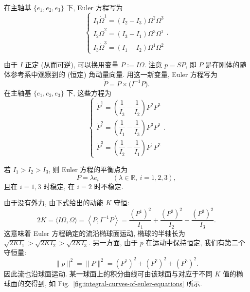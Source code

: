 在主轴基 $\{e_1,e_2,e_3\}$ 下, Euler 方程写为
\[
  \begin{cases}
    I_1\dot\Omega^1=(I_2-I_3)\Omega^2\Omega^3\\
    I_2\dot\Omega^2=(I_3-I_1)\Omega^3\Omega^1\\
    I_3\dot\Omega^3=(I_1-I_2)\Omega^1\Omega^2
  \end{cases}.
\]

由于 $I$ 正定 (从而可逆), 可以换用变量 $P:=I\Omega$. 注意 $p=SP$, 即 $P$ 是在刚体的随体参考系中观察到的 (恒定) 角动量向量. 用这一新变量, Euler 方程写为
\[
  \dot P=P\times\bigl(I^{-1}P\bigr).
\]
在主轴基 $\{e_1,e_2,e_3\}$ 下, 这些方程为
\[
  \begin{cases}
    \dot P^1=\left(\dfrac{1}{I_3}-\dfrac{1}{I_2}\right)P^2P^3\\
    \dot P^2=\left(\dfrac{1}{I_1}-\dfrac{1}{I_3}\right)P^3P^1\\
    \dot P^3=\left(\dfrac{1}{I_2}-\dfrac{1}{I_1}\right)P^1P^2
  \end{cases}.
\]

\begin{RiemannProposition}\label{prop:stable-and-unstable-principal-axis-rotations}
若 $I_1>I_2>I_3$, 则 Euler 方程的平衡点为
\[
  P=\lambda e_i\qquad(\lambda\in\mathbb{R},\ i=1,2,3),
\]
且在 $i=1,3$ 时稳定, 在 $i=2$ 时不稳定.
\end{RiemannProposition}

\begin{RiemannProof}
由于没有外力, 由下式给出的动能 $K$ 守恒:
\[
  2K=\langle I\Omega,\Omega\rangle
  =\left\langle P,I^{-1}P\right\rangle
  =\frac{(P^1)^2}{I_1}+\frac{(P^2)^2}{I_2}+\frac{(P^3)^2}{I_3}.
\]
这意味着 Euler 方程确定的流沿椭球面运动, 椭球的半轴长为 $\sqrt{2KI_1}>\sqrt{2KI_2}>\sqrt{2KI_3}$. 另一方面, 由于 $p$ 在运动中保持恒定, 我们有第二个守恒量:
\[
  \|p\|^2=\|P\|^2=(P^1)^2+(P^2)^2+(P^3)^2.
\]
因此流也沿球面运动. 某一球面上的积分曲线可由该球面与对应于不同 $K$ 值的椭球面的交得到, 如 Fig.~\ref{fig:integral-curves-of-euler-equations} 所示.
\end{RiemannProof}

